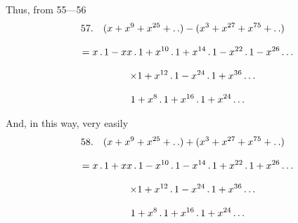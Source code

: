 Thus, from 55---56
\[
\begin{gathered}
57.\quad{}
(x+x^9+x^{25}+ .\,. )-(x^3+x^{27}+x^{75}+ .\,. )\\[8pt]
\quad=x\,.\,1-xx\,.\,1+x^{10}\,.\,1+x^{14}\,.\,1-x^{22}\,.\,1-x^{26}\mathinner{.\,.\,.}\\[8pt]
\qquad\times1+x^{12}\,.\,1-x^{24}\,.\,1+x^{36}\mathinner{.\,.\,.}\\[8pt]\quad{}1+x^8\,.\,1+x^{16}\,.\,1+x^{24}\mathinner{.\,.\,.}
\end{gathered}
\]


And, in this way, very easily
\[
\begin{gathered}
58.\quad{}
(x+x^9+x^{25}+ .\,. )+(x^3+x^{27}+x^{75}+ .\,. )\\[8pt]
\quad=x\,.\,1+xx\,.\,1-x^{10}\,.\,1-x^{14}\,.\,1+x^{22}\,.\,1+x^{26}\mathinner{.\,.\,.}\\[8pt]
\qquad\times1+x^{12}\,.\,1-x^{24}\,.\,1+x^{36}\mathinner{.\,.\,.}\\[8pt]\quad{}1+x^8\,.\,1+x^{16}\,.\,1+x^{24}\mathinner{.\,.\,.}
\end{gathered}
\]

\clearpage
\endgroup
